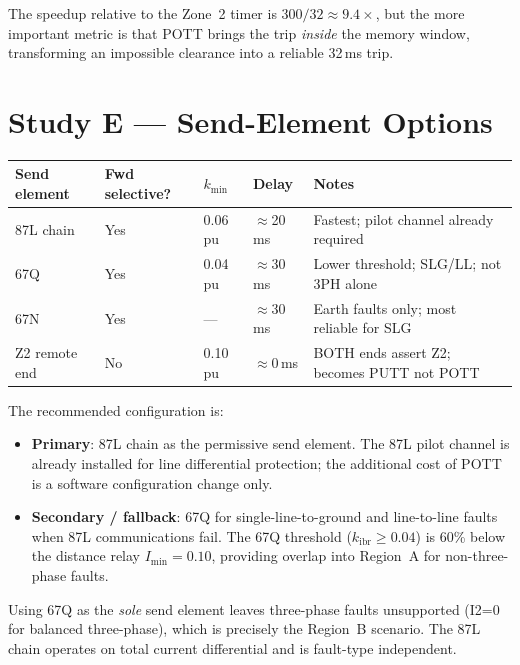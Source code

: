 \documentclass[11pt,a4paper]{article}
\begin{document}
\medskip\noindent
The speedup relative to the Zone~2 timer is
$300/32 \approx 9.4\times$, but the more important metric is that POTT
brings the trip \emph{inside} the memory window, transforming an impossible
clearance into a reliable 32\,ms trip.

\section{Study E --- Send-Element Options}
\label{sec:elements}

\begin{center}
\begin{tabular}{@{}lllll@{}}
\toprule
Send element & Fwd selective? & $k_\mathrm{min}$ & Delay & Notes\\
\midrule
87L chain     & Yes & 0.06\,pu & $\approx$20\,ms & Fastest; pilot channel already required\\
67Q           & Yes & 0.04\,pu & $\approx$30\,ms & Lower threshold; SLG/LL; not 3PH alone\\
67N           & Yes & ---       & $\approx$30\,ms & Earth faults only; most reliable for SLG\\
Z2 remote end & No  & 0.10\,pu & $\approx$0\,ms  & BOTH ends assert Z2; becomes PUTT not POTT\\
\bottomrule
\end{tabular}
\end{center}

\medskip\noindent
The recommended configuration is:
\begin{itemize}
  \item \textbf{Primary}: 87L chain as the permissive send element.  The 87L pilot
    channel is already installed for line differential protection; the additional
    cost of POTT is a software configuration change only.
  \item \textbf{Secondary / fallback}: 67Q for single-line-to-ground and
    line-to-line faults when 87L communications fail.  The 67Q threshold
    ($k_\mathrm{ibr}\geq0.04$) is 60\% below the distance relay
    $I_\mathrm{min}=0.10$, providing overlap into Region~A for non-three-phase faults.
\end{itemize}

Using 67Q as the \emph{sole} send element leaves three-phase faults unsupported
(I2=0 for balanced three-phase), which is precisely the Region~B scenario.  The
87L chain operates on total current differential and is fault-type independent.
\end{document}
